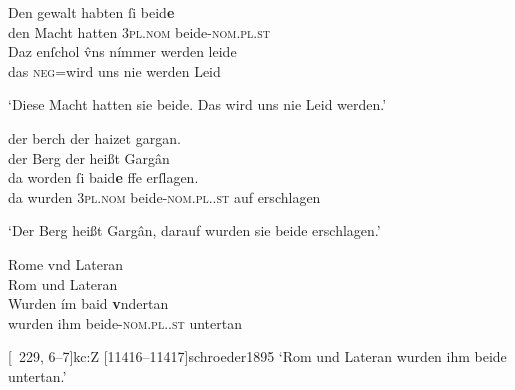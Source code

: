 \begin{exe}
\ex \label{ex:neutralpos}
	\gll Den gewalt habten ſi beid\textbf{e} \\
		den Macht hatten \textsc{3pl\subM.nom} beide-\textsc{nom.pl\subM.st} \\
\sn \gll Daz enſchol v̂ns nímmer werden leide \\
		das \textsc{neg}=wird uns nie werden Leid \\
	\begin{taggedline}{\parencites%
		[\pno~13\ra, 41--42]{kc:B1}[vgl.]%
		[\pno~18\rb, 3]{kc:A1}
		[\pno~24\vb, 35]{kc:H}
		[\pno~32\ra, 3]{kc:M}
		[\pno~21\ra, 31]{kc:VB}
		[\pno~37\ra, 26]{kc:P}
		[\pno~23\rb, 5]{kc:C1}
		[\pno~25\rb, 39]{kc:K}
		[\pno~83\ra, 5]{kc:Z}
		[4261--4264]{schroeder1895}
	}
	\trans `Diese Macht hatten sie beide. Das wird uns nie Leid werden.'
	\end{taggedline}

\ex \label{ex:neutralpos2}
	\begin{xlist}
	\ex \label{ex:neutralpos2_1}
		\gll der berch der haizet gargan. \\
			der Berg der heißt Gargân \\
	\sn \gll da worden ſi baid\textbf{e} \textbf{}ffe erſlagen. \\
			da wurden \textsc{3pl\subM.nom} beide-\textsc{nom.pl.\MascM.st} auf
				erschlagen \\
		\begin{taggedline}{\parencites%
			[\pno~33\rb, 28--30]{kc:A1}[vgl.]%
			[\pno~46\ra, 12]{kc:H}
			[\pno~58\vb, 15]{kc:M}
			[\pno~40\va, 15]{kc:C1}
			[\pno~46\va, 30]{kc:K}
			[\pno~152\va, 5]{kc:Z}
			[7704--7705]{schroeder1895}}
		\trans `Der Berg heißt Gargân, darauf wurden sie beide erschlagen.'
		\end{taggedline}

	\ex \label{ex:neutralpos2_2}
		\gll Rome vnd Lateran \\
			Rom und Lateran \\
	\sn \gll Wurden ím baid\textbf{} \textbf{v}ndertan \\
			wurden ihm beide-\textsc{nom.pl.\NeutI.st} untertan \\
		\begin{taggedline}{\parencites%
			[\pno~68\vb, 13--14]{kc:K}[vgl.]%
			[\pno~49\vb, 15--16]{kc:A1}
			[\pno~69\ra, 29--30]{kc:H}
			[\pno~87\ra, 32--33]{kc:M}
			[\pno~31\vb, 18--19]{kc:B1}
			[\pno~82\va, 45--46]{kc:VB}
			[\pno~60\ra, 14--15]{kc:C1}
			[\pno~229\ra, 6--7]{kc:Z}
			[11416--11417]{schroeder1895}}
		\trans `Rom und Lateran wurden ihm beide untertan.'
		\end{taggedline}
		\\
	\end{xlist}
\end{exe}

